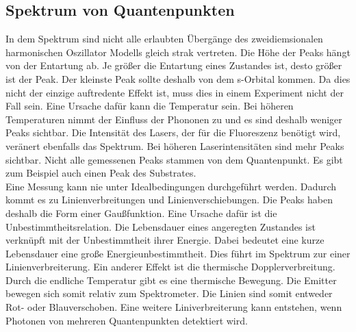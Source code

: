 \subsection{Spektrum von Quantenpunkten}
In dem Spektrum sind nicht alle erlaubten Übergänge des zweidiemsionalen harmonischen Oszillator Modells gleich strak vertreten. Die Höhe der Peaks hängt von der Entartung ab. Je grö{\ss}er die Entartung eines Zustandes ist, desto grö{\ss}er ist der Peak. Der kleinste Peak sollte deshalb von dem s-Orbital kommen. Da dies nicht der einzige auftredente Effekt ist, muss dies in einem Experiment nicht der Fall sein. Eine Ursache dafür kann die Temperatur sein. Bei höheren Temperaturen nimmt der Einfluss der Phononen zu und es sind deshalb weniger Peaks sichtbar. Die Intensität des Lasers, der für die Fluoreszenz benötigt wird, veränert ebenfalls das Spektrum. Bei höheren Laserintensitäten sind mehr Peaks sichtbar. Nicht alle gemessenen Peaks stammen von dem Quantenpunkt. Es gibt zum Beispiel auch einen Peak des Substrates. \\
Eine Messung kann nie unter Idealbedingungen durchgeführt werden. Dadurch kommt es zu Linienverbreitungen und Linienverschiebungen. Die Peaks haben deshalb die Form einer Gau{\ss}funktion. Eine Ursache dafür ist die Unbestimmtheitsrelation. Die Lebensdauer eines angeregten Zustandes ist verknüpft mit der Unbestimmtheit ihrer Energie.  Dabei bedeutet eine kurze Lebensdauer eine gro{\ss}e Energieunbestimmtheit. Dies führt im Spektrum zur einer Linienverbreiterung. Ein anderer Effekt ist die thermische Dopplerverbreitung. Durch die endliche Temperatur gibt es eine thermische Bewegung. Die Emitter bewegen sich somit relativ zum Spektrometer. Die Linien sind somit entweder Rot- oder Blauverschoben. Eine weitere Liniverbreiterung kann entstehen, wenn Photonen von mehreren Quantenpunkten detektiert wird. 
